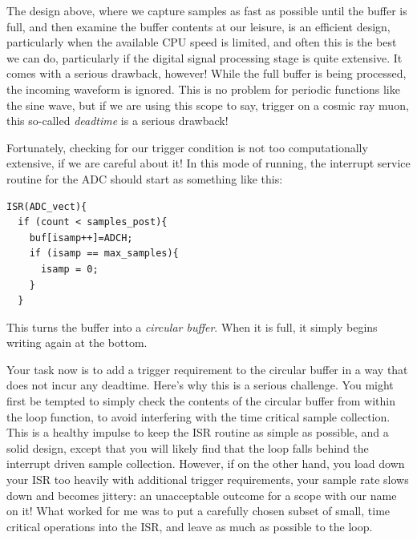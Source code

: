 \documentclass[12pt]{article}
\begin{document}
The design above, where we capture samples as fast as possible until the buffer is full, and then examine the buffer contents at our leisure, is an efficient design, particularly when the available CPU speed is limited, and often this is the best we can do, particularly if the digital signal processing stage is quite extensive.  It comes with a serious drawback, however!  While the full buffer is being processed, the incoming waveform is ignored.  This is no problem for periodic functions like the sine wave, but if we are using this scope to say, trigger on a cosmic ray muon, this so-called {\em deadtime} is a serious drawback!

Fortunately, checking for our trigger condition is not too computationally extensive, if we are careful about it!  In this mode of running, the interrupt service routine for the ADC should start as something like this:

\begin{verbatim}
ISR(ADC_vect){
  if (count < samples_post){
    buf[isamp++]=ADCH;
    if (isamp == max_samples){
      isamp = 0;
    }  
  }
\end{verbatim}

This turns the buffer into a {\em circular buffer}.  When it is full, it simply begins writing again at the bottom.

Your task now is to add a trigger requirement to the circular buffer in a way that does not incur any deadtime.  Here's why this is a serious challenge.  You might first be tempted to simply check the contents of the circular buffer from within the loop function, to avoid interfering with the time critical sample collection.  This is a healthy impulse to keep the ISR routine as simple as possible, and a solid design, except that you will likely find that the loop falls behind the interrupt driven sample collection.  However, if on the other hand, you load down your ISR too heavily with additional trigger requirements, your sample rate slows down and becomes jittery:  an unacceptable outcome for a scope with our name on it!  What worked for me was to put a carefully chosen subset of small, time critical operations into the ISR, and leave as much as possible to the loop.
\end{document}
